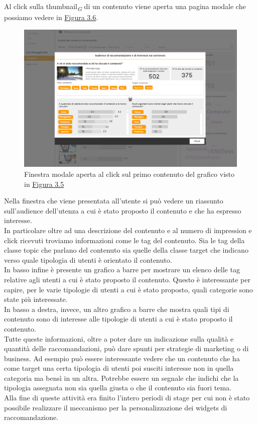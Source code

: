 \documentclass[a4paper, 12pt, twoside, openright]{book}
\newcommand{\gloss}[1]{#1\textsubscript{\textit{\tiny{G}}}}
\begin{document}
Al click sulla \gloss{thumbnail} di un contenuto viene aperta una pagina modale che possiamo vedere in \hyperref[grafico-qualitativo-2]{Figura 3.6}. 
\begin{figure}[H]
	\centering
	\label{grafico-qualitativo-2}
	\includegraphics[width=1.0\textwidth]{images/grafico-qualitativo-2.jpg}
	\caption{Finestra modale aperta al click sul primo contenuto del grafico visto in \hyperref[grafico-qualitativo-1]{Figura 3.5}}
\end{figure}
Nella finestra che viene presentata all'utente si può vedere un riassunto sull'audience dell'utenza a cui è stato proposto il contenuto e che ha espresso interesse.\\
In particolare oltre ad una descrizione del contenuto e al numero di impression e click ricevuti troviamo informazioni come le tag del contenuto. Sia le tag della classe topic che parlano del contenuto sia quelle della classe target che indicano verso quale tipologia di utenti è orientato il contenuto.\\
In basso infine è presente un grafico a barre per mostrare un elenco delle tag relative agli utenti a cui è stato proposto il contenuto. Questo è interessante per capire, per le varie tipologie di utenti a cui è stato proposto, quali categorie sono state più interessate.\\
In basso a destra, invece, un altro grafico a barre che mostra quali tipi di contenuto sono di interesse alle tipologie di utenti a cui è stato proposto il contenuto.\\
Tutte queste informazioni, oltre a poter dare un indicazione sulla qualità e quantità delle raccomandazioni, può dare spunti per strategie di marketing o di business. Ad esempio può essere interessante vedere che un contenuto che ha come target una certa tipologia di utenti poi susciti interesse non in quella categoria ma bensì in un altra. Potrebbe essere un segnale che indichi che la tipologia assegnata non sia quella giusta o che il contenuto sia fuori tema.\\
Alla fine di queste attività era finito l'intero periodi di stage per cui non è stato possibile realizzare il meccanismo per la personalizzazione dei widgets di raccomandazione.
\end{document}
